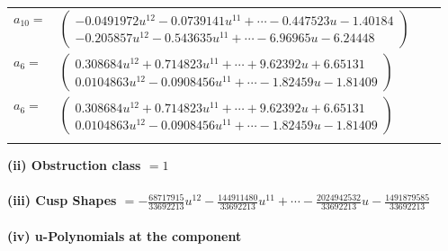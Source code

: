 \documentclass[1p]{elsarticle_modified}
\theoremstyle{definition}
\begin{document}
\begin{tabular}{m{7pt} m{180pt} m{7pt} m{180pt} }
\flushright $a_{10}=$&$\begin{pmatrix}-0.0491972 u^{12}-0.0739141 u^{11}+\cdots-0.447523 u-1.40184\\-0.205857 u^{12}-0.543635 u^{11}+\cdots-6.96965 u-6.24448\end{pmatrix}$ \\
\flushright $a_{6}=$&$\begin{pmatrix}0.308684 u^{12}+0.714823 u^{11}+\cdots+9.62392 u+6.65131\\0.0104863 u^{12}-0.0908456 u^{11}+\cdots-1.82459 u-1.81409\end{pmatrix}$\\ \flushright $a_{6}=$&$\begin{pmatrix}0.308684 u^{12}+0.714823 u^{11}+\cdots+9.62392 u+6.65131\\0.0104863 u^{12}-0.0908456 u^{11}+\cdots-1.82459 u-1.81409\end{pmatrix}$\\&\end{tabular}
\flushleft \textbf{(ii) Obstruction class $= 1$}\\~\\
\flushleft \textbf{(iii) Cusp Shapes $= -\frac{68717915}{33692213} u^{12}-\frac{144911480}{33692213} u^{11}+\cdots-\frac{2024942532}{33692213} u-\frac{1491879585}{33692213}$}\\~\\
\newpage\renewcommand{\arraystretch}{1}
\flushleft \textbf{(iv) u-Polynomials at the component}\newline \\
\end{document}
